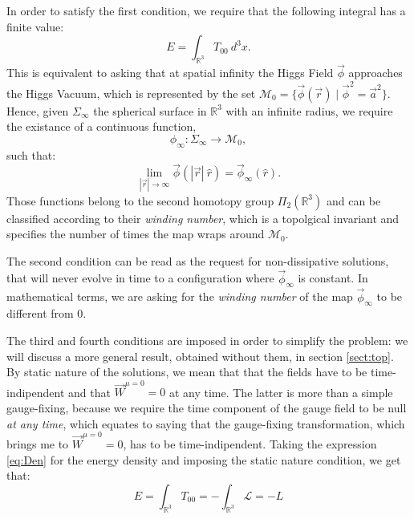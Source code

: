 \documentclass[main.tex]{subfiles}
\begin{document}
 In order to satisfy the first condition, we require that the following integral has a finite value: 
 \begin{equation}
 E = \int_{\mathbb{R}^3} T_{00} \ d^3x.
 \end{equation}
 This is equivalent to asking that at spatial infinity the Higgs Field $\vec{\phi}$ approaches the Higgs Vacuum, which is represented by the set $\mathcal{M}_0 = \{ \vec{\phi}(\vec{r})  \mid  \vec{\phi}^2 = \vec{a}^2 \}$. 
 Hence, given $\Sigma_{\infty}$ the spherical surface in $\mathbb{R}^3$ with an infinite radius, we require the existance of a continuous function, 
 \begin{equation}
     \phi_{\infty} \colon \Sigma_{\infty}  \to \mathcal{M}_0 ,
  \end{equation}
 such that:
 \begin{equation}
     \lim_{|\vec{r}|\to \infty} \vec{\phi}(|\vec{r}| \ \hat{r}) = \vec{\phi}_{\infty}(\hat{r}).
 \end{equation}
  Those functions belong to the second homotopy group $\Pi_2(\mathbb{R}^3)$ and can be classified according to their \textit{winding number}, which is a topolgical invariant and specifies the number of times the map wraps around $\mathcal{M}_0$.
  \medskip
  
  The second condition can be read as the request for non-dissipative solutions, that will never evolve in time to a configuration where $\vec{\phi}_{\infty}$ is constant. In mathematical terms, we are asking for the \textit{winding number} of the map $\vec{\phi}_{\infty}$ to be different from 0.
  \medskip
  
  The third and fourth conditions are imposed in order to simplify the problem: we will discuss a more general result, obtained without them, in section \ref{sect:top}.
  By static nature of the solutions, we mean that that the fields have to be time-indipendent and that $\vec{W}^{\mu = 0}= 0$ at any time. The latter is more than a simple gauge-fixing, because we require the time component of the gauge field to be null \textit{at any time}, which equates to saying that the gauge-fixing transformation, which brings me to $ \vec{W}^{\mu = 0}= 0$, has to be time-indipendent. Taking the expression \ref{eq:Den} for the energy density and imposing the static nature condition, we get that: 
  \begin{equation}
      E = \int_{\mathbb{R}^3} T_{00} = - \int_{\mathbb{R}^3} \mathcal{L} = -L
      \label{eq:En}
  \end{equation}
 
\end{document}
